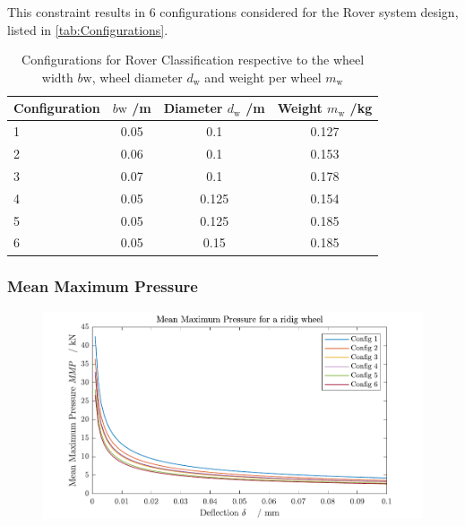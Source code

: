 This constraint results in 6 configurations considered for the Rover system design, listed in \autoref{tab:Configurations}.

\begin{table}[htb]
\centering
\caption{Configurations for Rover Classification respective to the wheel width \(b\text{w}\), wheel diameter \(d_\text{w}\) and weight per wheel \(m_\text{w}\)}
\begin{adjustbox}{max width=\textwidth}
\begin{tabular}[l]{lccc}

	\toprule
		\multicolumn{1}{l}{Configuration} & \multicolumn{1}{c}{\(b\text{w}\) /m} & \multicolumn{1}{c}{Diameter \(d_\text{w}\) /m} & \multicolumn{1}{c}{Weight \(m_\text{w}\) /kg}   \\

	\midrule
		
		1	&	0.05	&	0.1		&	0.127		\\	
		2	&	0.06	&	0.1		&	0.153		\\
		3	&	0.07	&	0.1		&	0.178		\\
		4	&	0.05	&	0.125	&	0.154		\\
		5	&	0.05	&	0.125	&	0.185		\\
		6	&	0.05	&	0.15	&	0.185		\\

	\bottomrule

\end{tabular}
\end{adjustbox}
\label{tab:Configurations}
\end{table}




\subsubsection*{Mean Maximum Pressure}
\label{sec:MMP}



\begin{figure}[htb] 
  \centering
     \includegraphics[width=1\textwidth]{Media/MMP for each Config.pdf}
  \caption{}
  \label{fig:}
\end{figure}

